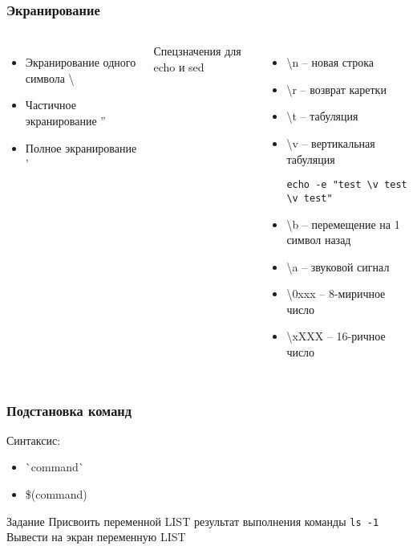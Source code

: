 \begin{frame}[fragile]
	\frametitle{Экранирование}

	\begin{columns}
		\begin{itemize}
			\item Экранирование одного символа \textbackslash 
			\item Частичное экранирование ''
			\item Полное экранирование '
		\end{itemize}
		\pause
		Спецзначения для echo и sed
		\begin{itemize}
			\item \textbackslash{n} -- новая строка
			\item \textbackslash{r} -- возврат каретки
			\item \textbackslash{t} -- табуляция
			\item \textbackslash{v} -- вертикальная табуляция \\
				\small\begin{lstlisting}
echo -e "test \v test \v test"
				\end{lstlisting}
			\item \textbackslash{b} -- перемещение на 1 символ назад
			\item \textbackslash{a} -- звуковой сигнал
			\item \textbackslash{0xxx} -- 8-миричное число
			\item \textbackslash{xXXX} -- 16-ричное число
		\end{itemize}
	\end{columns}

\end{frame}


\begin{frame}
	\frametitle{Подстановка команд}
	
	Синтаксис:

	\begin{itemize}
		\item \`{}command\`{}
		\item \$(command)
	\end{itemize}
	\pause
	\begin{block}{Задание}
		Присвоить переменной LIST результат выполнения команды {\tt ls -1} \\
		Вывести на экран переменную LIST
	\end{block}
\end{frame}


